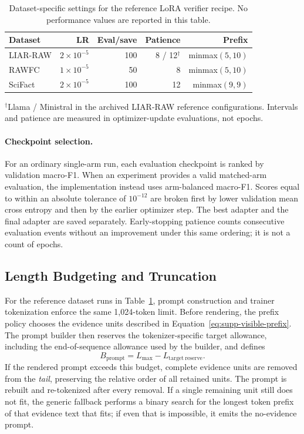 \begin{table}[t]
\centering
\scriptsize
\setlength{\tabcolsep}{2pt}
\renewcommand{\arraystretch}{1.08}
\caption{Dataset-specific settings for the reference LoRA verifier recipe. No performance values are reported in this table.}
\label{tab:supp-lora-settings}
\begin{tabular}{lrrrr}
\hline
\textbf{Dataset} & \textbf{LR} & \textbf{Eval/save} & \textbf{Patience} & \textbf{Prefix}\\
\hline
LIAR-RAW & $2{\times}10^{-5}$ & 100 & 8 / 12$^\dagger$ & minmax$(5,10)$\\
RAWFC & $1{\times}10^{-5}$ & 50 & 8 & minmax$(5,10)$\\
SciFact & $2{\times}10^{-5}$ & 100 & 12 & minmax$(9,9)$\\
\hline
\end{tabular}
\vspace{2pt}

\footnotesize $^\dagger$Llama / Ministral in the archived LIAR-RAW
reference configurations.  Intervals and patience are measured in
optimizer-update evaluations, not epochs.
\end{table}

\paragraph{Checkpoint selection.}
For an ordinary single-arm run, each evaluation checkpoint is ranked by
validation macro-F1.  When an experiment provides a valid matched-arm
evaluation, the implementation instead uses arm-balanced macro-F1.
Scores equal to within an absolute tolerance of $10^{-12}$ are broken
first by lower validation mean cross entropy and then by the earlier
optimizer step.  The best adapter and the final adapter are saved
separately.  Early-stopping patience counts consecutive evaluation events
without an improvement under this same ordering; it is not a count of
epochs.

\subsection{Length Budgeting and Truncation}
\label{sec:supp-truncation}

For the reference dataset runs in
Table~\ref{tab:supp-lora-settings}, prompt construction and trainer
tokenization enforce the same 1,024-token limit.  Before rendering, the
prefix policy chooses the evidence units
described in Equation~\ref{eq:supp-visible-prefix}.  The prompt builder
then reserves the tokenizer-specific target allowance, including the
end-of-sequence allowance used by the builder, and defines
\begin{equation}
B_{\mathrm{prompt}}=L_{\max}-L_{\mathrm{target\ reserve}}.
\end{equation}
If the rendered prompt exceeds this budget, complete evidence units are
removed from the \emph{tail}, preserving the relative order of all retained
units.  The prompt is rebuilt and re-tokenized after every removal.  If a
single remaining unit still does not fit, the generic fallback performs a
binary search for the longest token prefix of that evidence text that
fits; if even that is impossible, it emits the no-evidence prompt.

